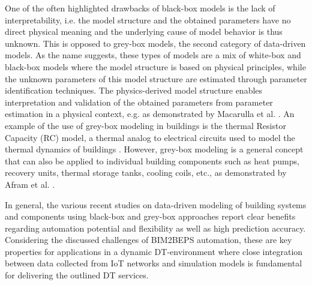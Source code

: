 One of the often highlighted drawbacks of black-box models is the lack of interpretability, i.e. the model structure and the obtained parameters have no direct physical meaning and the underlying cause of model behavior is thus unknown. This is opposed to grey-box models, the second category of data-driven models. As the name suggests, these types of models are a mix of white-box and black-box models where the model structure is based on physical principles, while the unknown parameters of this model structure are estimated through parameter identification techniques. The physics-derived model structure enables interpretation and validation of the obtained parameters from parameter estimation in a physical context, e.g. as demonstrated by Macarulla et al. \cite{Macarulla2017}. An example of the use of grey-box modeling in buildings is the thermal Resistor Capacity (RC) model, a thermal analog to electrical circuits used to model the thermal dynamics of buildings \cite{yu2019a, park2013a}. However, grey-box modeling is a general concept that can also be applied to individual building components such as heat pumps, recovery units, thermal storage tanks, cooling coils, etc., as demonstrated by Afram et al. \cite{AFRAM2015134}.


In general, the various recent studies on data-driven modeling of building systems and components using black-box and grey-box approaches report clear benefits regarding automation potential and flexibility as well as high prediction accuracy. Considering the discussed challenges of BIM2BEPS automation, these are key properties for applications in a dynamic DT-environment where close integration between data collected from IoT networks and simulation models is fundamental for delivering the outlined DT services. 




